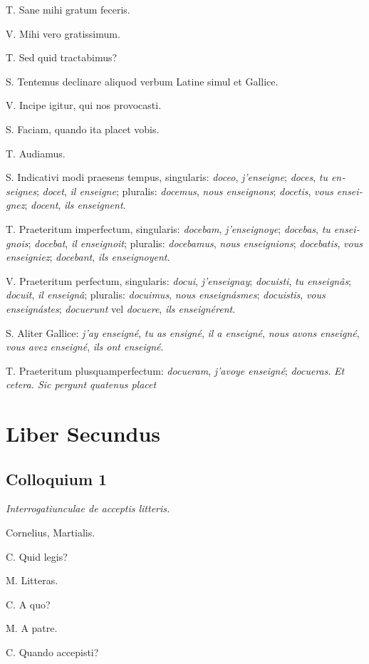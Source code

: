 \documentclass{article}
\newcommand{\fr}[1]{\foreignlanguage{french}{\emph{#1}}}
\begin{document}
T. Sane mihi gratum feceris.

V. Mihi vero gratissimum.

T. Sed quid tractabimus?

S. Tentemus declinare aliquod verbum Latine simul et Gallice.

V. Incipe igitur, qui nos provocasti.

S. Faciam, quando ita placet vobis.

T. Audiamus.

S. Indicativi modi praesens tempus, singularis: \emph{doceo}, \fr{j'enseigne}; \emph{doces}, \fr{tu enseignes}; \emph{docet}, \fr{il enseigne}; pluralis: \emph{docemus}, \fr{nous enseignons}; \emph{docetis}, \fr{vous enseignez}; \emph{docent}, \fr{ils enseignent}.

T. Praeteritum imperfectum, singularis: \emph{docebam}, \fr{j'enseignoye}; \emph{docebas}, \fr{tu enseignois}; \emph{docebat}, \fr{il enseignoit}; pluralis: \emph{docebamus}, \fr{nous enseignions}; \emph{docebatis}, \fr{vous enseigniez}; \emph{docebant}, \fr{ils enseignoyent}.

V. Praeteritum perfectum, singularis: \emph{docui}, \fr{j'enseignay}; \emph{docuisti}, \fr{tu enseignâs}; \emph{docuit}, \fr{il enseignâ}; pluralis: \emph{docuimus}, \fr{nous enseignásmes}; \emph{docuistis}, \fr{vous enseignástes}; \emph{docuerunt} vel \emph{docuere}, \fr{ils enseignérent}.

S. Aliter Gallice: \fr{j'ay enseigné}, \fr{tu as ensigné}, \fr{il a enseigné}, \fr{nous avons enseigné}, \fr{vous avez enseigné}, \fr{ils ont enseigné}.

T. Praeteritum plusquamperfectum: \emph{docueram}, \fr{j'avoye enseigné}; \emph{docueras}. \emph{Et cetera. Sic pergunt quatenus placet}

\section{Liber Secundus} %
\subsection{Colloquium 1}
\emph{Interrogatiunculae de acceptis litteris.}

Cornelius, Martialis.

C. Quid legis?

M. Litteras.

C. A quo?

M. A patre. 

C. Quando accepisti?
\end{document}
